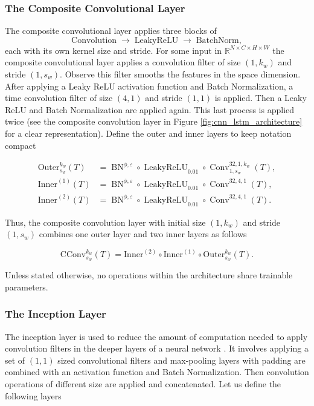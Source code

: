 \documentclass[10pt,a4paper,oneside]{article}
\newcommand{\R}{\mathbb{R}}
\DeclareMathOperator{\LeakyReLU}{LeakyReLU}
\DeclareMathOperator{\batchnorm}{BN}
\DeclareMathOperator{\convolution}{Conv}
\providecommand{\DIFdelbegin}{} %
\providecommand{\DIFdelend}{} %
\newcommand{\DIFscaledelfig}{0.5}
\newlength{\DIFdelgraphicswidth} %
\newlength{\DIFdelgraphicsheight} %
\newcommand{\DIFdelincludegraphics}[2][]{%
\sbox{\DIFdelgraphicsbox}{\DIFOincludegraphics[#1]{#2}}%
\settoboxwidth{\DIFdelgraphicswidth}{\DIFdelgraphicsbox} %
\settoboxtotalheight{\DIFdelgraphicsheight}{\DIFdelgraphicsbox} %
\scalebox{\DIFscaledelfig}{%
\parbox[b]{\DIFdelgraphicswidth}{\usebox{\DIFdelgraphicsbox}\\[-\baselineskip] \rule{\DIFdelgraphicswidth}{0em}}\llap{\resizebox{\DIFdelgraphicswidth}{\DIFdelgraphicsheight}{%
\setlength{\unitlength}{\DIFdelgraphicswidth}%
\begin{picture}(1,1)%
\thicklines\linethickness{2pt} %
{\color[rgb]{1,0,0}\put(0,0){\framebox(1,1){}}}%
{\color[rgb]{1,0,0}\put(0,0){\line( 1,1){1}}}%
{\color[rgb]{1,0,0}\put(0,1){\line(1,-1){1}}}%
\end{picture}%
}\hspace*{3pt}}} %
} %
\DeclareRobustCommand{\DIFdelbegin}{\DIFOdelbegin \let\includegraphics\DIFdelincludegraphics} %
\DeclareRobustCommand{\DIFdelend}{\DIFOaddend \let\includegraphics\DIFOincludegraphics} %
\begin{document}
\subsubsection{The Composite Convolutional Layer}
\label{subsubsec:comp_conv}

The composite convolutional layer applies three blocks of
\[
  \text{Convolution} \;\to\;\text{LeakyReLU} \;\to\;\text{BatchNorm},
\]
each with its own kernel size and stride. For some input in $\R^{N \times C \times H \times W}$ the composite convolutional layer applies a convolution filter of size $(1, k_w)$ and stride $(1, s_w)$. Observe this filter smooths the features in the space dimension. After applying a Leaky ReLU activation function and Batch Normalization, a time convolution filter of size $(4, 1)$ and stride $(1, 1)$ is applied. Then a Leaky ReLU and Batch Normalization are applied again. This last process is applied twice (see the composite convolution layer in Figure \ref{fig:cnn_lstm_architecture} for a clear representation). Define the outer and inner layers to keep notation compact

\begin{align*}
    \mathrm{Outer}^{k_w}_{s_w}(T) &= \batchnorm^{\phi, \varepsilon} \circ \LeakyReLU_{0.01} \circ \convolution^{32, 1, k_w}_{1, s_w}(T),\\
    \mathrm{Inner}^{(1)}(T) &= \batchnorm^{\phi,\varepsilon}\circ\LeakyReLU_{0.01}\circ\convolution^{32,4,1}(T),\\
\mathrm{Inner}^{(2)}(T) &= \batchnorm^{\phi,\varepsilon}\circ\LeakyReLU_{0.01}\circ\convolution^{32,4,1}(T).
\end{align*}
\DIFdelbegin %

\DIFdelend Thus, the composite convolution layer with initial size $(1, k_w)$ and stride $(1, s_w)$ combines one outer layer and two inner layers as follows 

$$
\mathrm{CConv}^{k_w}_{s_w}(T) = \mathrm{Inner}^{(2)} \circ \mathrm{Inner}^{(1)} \circ \mathrm{Outer}^{k_w}_{s_w} (T).
$$
\DIFdelbegin %

\DIFdelend Unless stated otherwise, no operations within the architecture share trainable parameters.

\subsubsection{The Inception Layer}

The inception layer is used to reduce the amount of computation needed to apply convolution filters in the deeper layers of a neural network \cite{szegedy2015going}. It involves applying a set of $(1, 1)$ sized convolutional filters and max-pooling layers with padding are combined with an activation function and Batch Normalization. Then convolution operations of different size are applied and concatenated. Let us define the following layers
\end{document}
